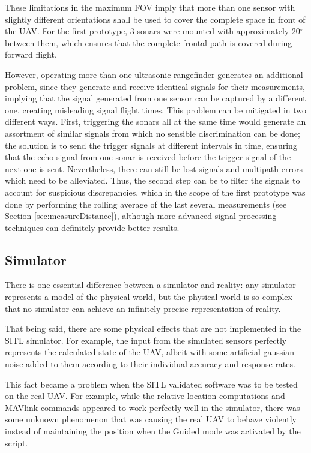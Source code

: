 

These limitations in the maximum FOV imply that more than one sensor with slightly different orientations shall be used to cover the complete space in front of the UAV.
For the first prototype, 3 sonars were mounted with approximately 20$^\circ$ between them, which ensures that the complete frontal path is covered during forward flight.

However, operating more than one ultrasonic rangefinder generates an additional problem, since they generate and receive identical signals for their measurements, implying that the signal generated from one sensor can be captured by a different one, creating misleading signal flight times.
This problem can be mitigated in two different ways.
First, triggering the sonars all at the same time would generate an assortment of similar signals from which no sensible discrimination can be done; the solution is to send the trigger signals at different intervals in time, ensuring that the echo signal from one sonar is received before the trigger signal of the next one is sent.
Nevertheless, there can still be lost signals and multipath errors which need to be alleviated.
Thus, the second step can be to filter the signals to account for suspicious discrepancies, which in the scope of the first prototype was done by performing the rolling average of the last several measurements (see Section \ref{sec:measureDistance}), although more advanced signal processing techniques can definitely provide better results.


\subsection{Simulator} \label{sec:sitl}

There is one essential difference between a simulator and reality: any simulator represents a model of the physical world, but the physical world is so complex that no simulator can achieve an infinitely precise representation of reality.

That being said, there are some physical effects that are not implemented in the SITL simulator. For example, the input from the simulated sensors perfectly represents the calculated state of the UAV, albeit with some artificial gaussian noise added to them according to their individual accuracy and response rates.

This fact became a problem when the SITL validated software was to be tested on the real UAV.
For example, while the relative location computations and MAVlink commands appeared to work perfectly well in the simulator, there was some unknown phenomenon that was causing the real UAV to behave violently instead of maintaining the position when the Guided mode was activated by the script.


